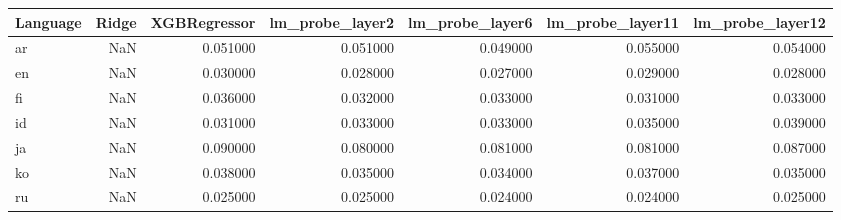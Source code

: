 \begin{tabular}{lrrrrrr}
\toprule
Language & Ridge & XGBRegressor & lm_probe_layer2 & lm_probe_layer6 & lm_probe_layer11 & lm_probe_layer12 \\
\midrule
ar & NaN & 0.051000 & 0.051000 & 0.049000 & 0.055000 & 0.054000 \\
en & NaN & 0.030000 & 0.028000 & 0.027000 & 0.029000 & 0.028000 \\
fi & NaN & 0.036000 & 0.032000 & 0.033000 & 0.031000 & 0.033000 \\
id & NaN & 0.031000 & 0.033000 & 0.033000 & 0.035000 & 0.039000 \\
ja & NaN & 0.090000 & 0.080000 & 0.081000 & 0.081000 & 0.087000 \\
ko & NaN & 0.038000 & 0.035000 & 0.034000 & 0.037000 & 0.035000 \\
ru & NaN & 0.025000 & 0.025000 & 0.024000 & 0.024000 & 0.025000 \\
\bottomrule
\end{tabular}
